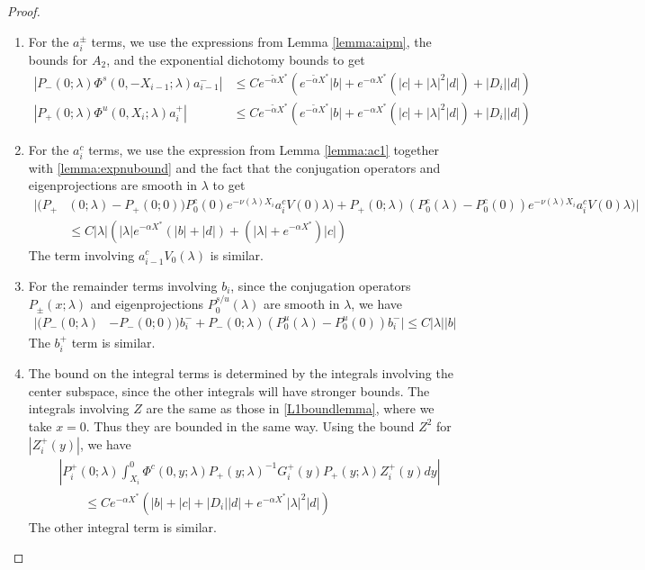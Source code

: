 \documentclass[thesis.tex]{subfiles}
\begin{document}
\begin{lemma}
\begin{proof}
\begin{enumerate}
\item For the $a_i^\pm$ terms, we use the expressions from Lemma \ref{lemma:aipm}, the bounds for $A_2$, and the exponential dichotomy bounds to get
\begin{align*}
|P_-(0; \lambda) \Phi^s(0, -X_{i-1}; \lambda) a_{i-1}^-| 
&\leq C e^{-\tilde{\alpha} X^*} \left( e^{-\tilde{\alpha} X^*} |b|  + e^{-\alpha X^*}(|c| + |\lambda|^2 |d|) + |D_i||d| \right)\\
|P_+(0; \lambda) \Phi^u(0, X_i; \lambda) a_i^+| 
&\leq C e^{-\tilde{\alpha} X^*} \left( e^{-\tilde{\alpha} X^*} |b|  + e^{-\alpha X^*}(|c| + |\lambda|^2 |d|) + |D_i||d| \right)
\end{align*}

\item For the $a_i^c$ terms, we use the expression from Lemma \ref{lemma:ac1} together with \cref{lemma:expnubound} and the fact that the conjugation operators and eigenprojections are smooth in $\lambda$ to get
\begin{align*}
|(P_+&(0; \lambda) - P_+(0; 0))P_0^c(0) e^{-\nu(\lambda)X_i} a_i^c V(0)
\lambda) + P_+(0; \lambda) (P_0^c(\lambda) - P_0^c(0)) e^{-\nu(\lambda)X_i} a_i^c V(0)
\lambda)| \\
&\leq C |\lambda| \left( |\lambda| e^{-\alpha X^*} \left( |b| + |d| \right) + (|\lambda| + e^{-\alpha X^*})|c| \right) 
\end{align*}
The term involving $a_{i-1}^c V_0(\lambda)$ is similar. 

\item For the remainder terms involving $b_i$, since the conjugation operators $P_\pm(x; \lambda)$ and eigenprojections $P_0^{s/u}(\lambda)$ are smooth in $\lambda$, we have
\begin{align*}
|(P_-(0; \lambda) &- P_-(0; 0))b_i^- + P_-(0; \lambda)(P_0^u(\lambda) - P_0^u(0))b_i^-| \leq C |\lambda| |b|
\end{align*}
The $b_i^+$ term is similar.

\item The bound on the integral terms is determined by the integrals involving the center subspace, since the other integrals will have stronger bounds. The integrals involving $Z$ are the same as those in \cref{L1boundlemma}, where we take $x = 0$. Thus they are bounded in the same way. Using the bound $Z^2$ for $| Z_i^+(y)|$, we have 
\begin{align*}
&\left| P_i^+(0; \lambda) \int_{X_i}^0 \Phi^c(0, y; \lambda) P_+(y; \lambda)^{-1} G_i^+(y) P_+(y; \lambda) Z_i^+(y) dy \right| \\
&\qquad \leq C e^{-\alpha X^*} \left(|b| + |c| + |D_i||d| + e^{-\alpha X^*}|\lambda|^2|d|\right)
\end{align*}
The other integral term is similar.


\end{enumerate}
\end{proof}
\end{lemma}
\end{document}
